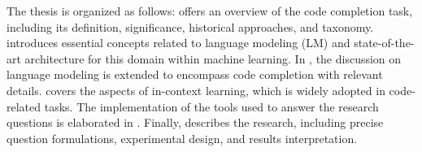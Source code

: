 The thesis is organized as follows:  offers an overview of the code completion task, including its definition, significance, historical approaches, and taxonomy.  introduces essential concepts related to language modeling (LM) and state-of-the-art architecture for this domain within machine learning. In , the discussion on language modeling is extended to encompass code completion with relevant details.  covers the aspects of in-context learning, which is widely adopted in code-related tasks. The implementation of the tools used to answer the research questions is elaborated in . Finally,  describes the research, including precise question formulations, experimental design, and results interpretation.
